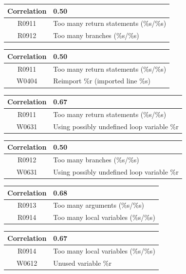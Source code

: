 \documentclass[12pt, a4paper]{article}
\newcommand{\tbf}[1]{\textbf{#1}}
\newcommand{\noi}{\noindent}
\begin{document}
\bigskip \noi
\begin{tabularx}{\textwidth}{|c|X|}
\hline
\tbf{Correlation}		& 0.50 \\
\hline
R0911		& Too many return statements (\%s/\%s) \\
\hline
R0912		& Too many branches (\%s/\%s) \\
\hline
\end{tabularx}


\bigskip \noi
\begin{tabularx}{\textwidth}{|c|X|}
\hline
\tbf{Correlation}		& 0.50 \\
\hline
R0911		& Too many return statements (\%s/\%s) \\
\hline
W0404		& Reimport \%r (imported line \%s) \\
\hline
\end{tabularx}


\bigskip \noi
\begin{tabularx}{\textwidth}{|c|X|}
\hline
\tbf{Correlation}		& 0.67 \\
\hline
R0911		& Too many return statements (\%s/\%s) \\
\hline
W0631		& Using possibly undefined loop variable \%r \\
\hline
\end{tabularx}


\bigskip \noi
\begin{tabularx}{\textwidth}{|c|X|}
\hline
\tbf{Correlation}		& 0.50 \\
\hline
R0912		& Too many branches (\%s/\%s) \\
\hline
W0631		& Using possibly undefined loop variable \%r \\
\hline
\end{tabularx}


\bigskip \noi
\begin{tabularx}{\textwidth}{|c|X|}
\hline
\tbf{Correlation}		& 0.68 \\
\hline
R0913		& Too many arguments (\%s/\%s) \\
\hline
R0914		& Too many local variables (\%s/\%s) \\
\hline
\end{tabularx}


\bigskip \noi
\begin{tabularx}{\textwidth}{|c|X|}
\hline
\tbf{Correlation}		& 0.67 \\
\hline
R0914		& Too many local variables (\%s/\%s) \\
\hline
W0612		& Unused variable \%r \\
\hline
\end{tabularx}
\end{document}
